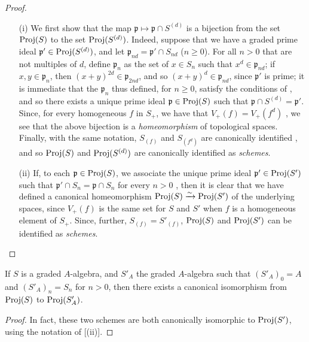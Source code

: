 \begin{proof}
\begin{enumerate}
  \item[{\rm(i)}] We first show that the map $\mathfrak{p}\mapsto\mathfrak{p}\cap S^{(d)}$ is a bijection from the set $\operatorname{Proj}(S)$ to the set $\operatorname{Proj}(S^{(d)})$.
    Indeed, suppose that we have a graded prime ideal $\mathfrak{p}'\in\operatorname{Proj}(S^{(d)})$, and let $\mathfrak{p}_{nd}=\mathfrak{p}'\cap S_{nd}$ ($n\geq0$).
    For all $n>0$ that are not multiples of $d$, define $\mathfrak{p}_n$ as the set of $x\in S_n$ such that $x^d\in\mathfrak{p}_{nd}$;
    if $x,y\in\mathfrak{p}_n$, then $(x+y)^{2d}\in\mathfrak{p}_{2nd}$, and so $(x+y)^d\in\mathfrak{p}_{nd}$, since $\mathfrak{p}'$ is prime;
    it is immediate that the $\mathfrak{p}_n$ thus defined, for $n\geq0$, satisfy the conditions of , and so there exists a unique prime ideal $\mathfrak{p}\in\operatorname{Proj}(S)$ such that $\mathfrak{p}\cap S^{(d)}=\mathfrak{p}'$.
    Since, for every homogeneous $f$ in $S_+$, we have that $V_+(f)=V_+(f^d)$ , we see that the above bijection is a \emph{homeomorphism} of topological spaces.
    Finally, with the same notation, $S_{(f)}$ and $S_{(f^d)}$ are canonically identified , and so $\operatorname{Proj}(S)$ and $\operatorname{Proj}(S^{(d)})$ are canonically identified as \emph{schemes}.
  \item[{\rm(ii)}] If, to each $\mathfrak{p}\in\operatorname{Proj}(S)$, we associate the unique prime ideal $\mathfrak{p}'\in\operatorname{Proj}(S')$ such that $\mathfrak{p}'\cap S_n=\mathfrak{p}\cap S_n$ for every $n>0$ , then it is clear that we have defined a canonical homeomorphism $\operatorname{Proj}(S)\xrightarrow{\sim}\operatorname{Proj}(S')$ of the underlying spaces, since $V_+(f)$ is the same set for $S$ and $S'$ when $f$ is a homogeneous element of $S_+$.
  Since, further, $S_{(f)}=S'_{(f)}$, $\operatorname{Proj}(S)$ and $\operatorname{Proj}(S')$ can be identified as \emph{schemes}.
\end{enumerate}
\end{proof}

\begin{corollary}[2.4.8]
\label{II.2.4.8}
If $S$ is a graded $A$-algebra, and $S'_A$ the graded $A$-algebra such that $(S'_A)_0=A$ and $(S'_A)_n=S_n$ for $n>0$, then there exists a canonical isomorphism from $\operatorname{Proj}(S)$ to $\operatorname{Proj}(S'_A)$.
\end{corollary}

\begin{proof}
In fact, these two schemes are both canonically isomorphic to $\operatorname{Proj}(S')$, using the notation of [(ii)].
\end{proof}


